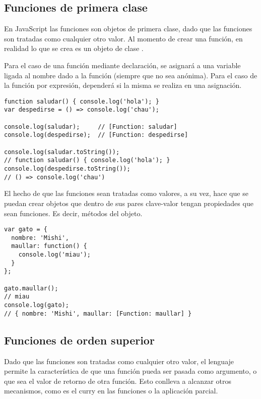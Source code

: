 \subsection{Funciones de primera clase}

En JavaScript las funciones son objetos de primera clase, dado que las funciones son tratadas como cualquier otro valor. Al momento de crear una función, en realidad lo que se crea es un objeto de clase .

Para el caso de una función mediante declaración, se asignará a una variable ligada al nombre dado a la función (siempre que no sea anónima). Para el caso de la función por expresión, dependerá si la misma se realiza en una asignación.

\begin{lstlisting}[title={Analizando el valor de una función}]
function saludar() { console.log('hola'); }
var despedirse = () => console.log('chau');

console.log(saludar);     // [Function: saludar]
console.log(despedirse);  // [Function: despedirse]

console.log(saludar.toString());  
// function saludar() { console.log('hola'); }
console.log(despedirse.toString()); 
// () => console.log('chau')
\end{lstlisting}

El hecho de que las funciones sean tratadas como valores, a su vez, hace que se puedan crear objetos que dentro de sus pares clave-valor tengan propiedades que sean funciones. Es decir, métodos del objeto.

\begin{lstlisting}[title={Asignando una función como valor de una propiedad a un objeto}]
var gato = {
  nombre: 'Mishi',
  maullar: function() {
    console.log('miau');
  }
};

gato.maullar();   
// miau
console.log(gato);  
// { nombre: 'Mishi', maullar: [Function: maullar] }
\end{lstlisting}

\subsection{Funciones de orden superior}

Dado que las funciones son tratadas como cualquier otro valor, el lenguaje permite la característica de que una función pueda ser pasada como argumento, o que sea el valor de retorno de otra función. Esto conlleva a alcanzar otros mecanismos, como es el curry en las funciones o la aplicación parcial.

